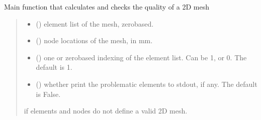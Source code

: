 \documentclass[letterpaper,10pt,english]{sphinxmanual}
\begin{document}
\begin{fulllineitems}
\label{\detokenize{_autosummary/nirfasterff.meshing.meshutils.CheckMesh2D:nirfasterff.meshing.meshutils.CheckMesh2D}}
\pysigstartsignatures
{}
\pysigstopsignatures
\sphinxAtStartPar
Main function that calculates and checks the quality of a 2D mesh
\begin{quote}\begin{description}
\begin{itemize}
\item {} 
\sphinxAtStartPar
{} () \textendash{} element list of the mesh, zero\sphinxhyphen{}based.

\item {} 
\sphinxAtStartPar
{} () \textendash{} node locations of the mesh, in mm.

\item {} 
\sphinxAtStartPar
{} (\sphinxstyleliteralemphasis{\sphinxupquote{, }}) \textendash{} one\sphinxhyphen{} or zero\sphinxhyphen{}based indexing of the element list. Can be 1, or 0. The default is 1.

\item {} 
\sphinxAtStartPar
{} (\sphinxstyleliteralemphasis{\sphinxupquote{, }}) \textendash{} whether print the problematic elements to stdout, if any. The default is False.

\end{itemize}

\sphinxAtStartPar
{} \textendash{} if elements and nodes do not define a valid 2D mesh.


\end{description}
\end{quote}
\end{fulllineitems}
\end{document}
